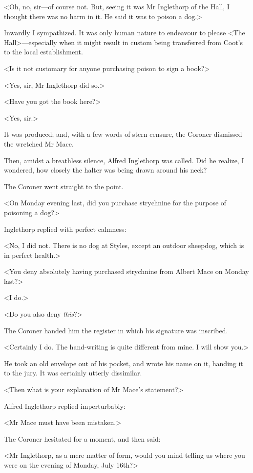  <Oh, no, sir—of course not. But, seeing it was Mr Inglethorp of the Hall, I thought there was no harm in it. He said it was to poison a dog.> 

 Inwardly I sympathized. It was only human nature to endeavour to please <The Hall>—especially when it might result in custom being transferred from Coot's to the local establishment. 

 <Is it not customary for anyone purchasing poison to sign a book?> 

 <Yes, sir, Mr Inglethorp did so.> 

 <Have you got the book here?> 

 <Yes, sir.> 

 It was produced; and, with a few words of stern censure, the Coroner dismissed the wretched Mr Mace. 

 Then, amidst a breathless silence, Alfred Inglethorp was called. Did he realize, I wondered, how closely the halter was being drawn around his neck? 

 The Coroner went straight to the point. 

 <On Monday evening last, did you purchase strychnine for the purpose of poisoning a dog?> 

 Inglethorp replied with perfect calmness: 

 <No, I did not. There is no dog at Styles, except an outdoor sheepdog, which is in perfect health.> 

 <You deny absolutely having purchased strychnine from Albert Mace on Monday last?> 

 <I do.> 

 <Do you also deny \emph{this}?> 

 The Coroner handed him the register in which his signature was inscribed. 

 <Certainly I do. The hand-writing is quite different from mine. I will show you.> 

 He took an old envelope out of his pocket, and wrote his name on it, handing it to the jury. It was certainly utterly dissimilar. 

 <Then what is your explanation of Mr Mace's statement?> 

 Alfred Inglethorp replied imperturbably: 

 <Mr Mace must have been mistaken.> 

 The Coroner hesitated for a moment, and then said: 

 <Mr Inglethorp, as a mere matter of form, would you mind telling us where you were on the evening of Monday, July 16th?> 

